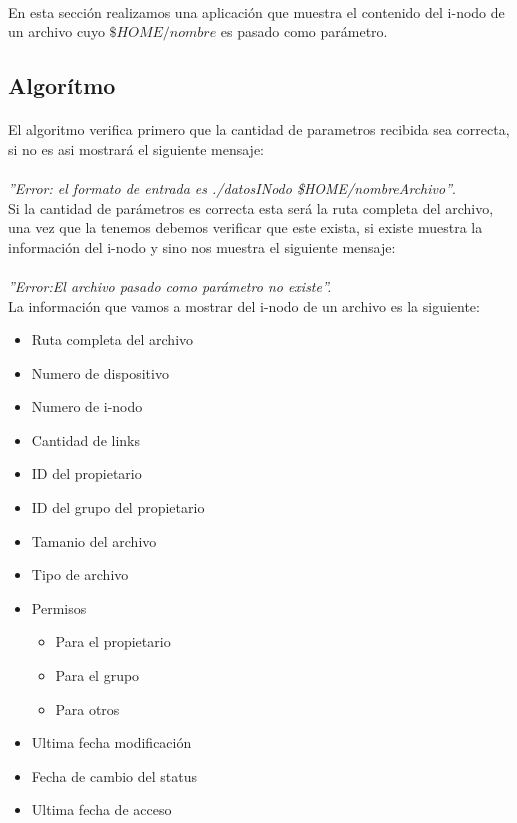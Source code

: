 \paragraph{} En esta secci\'on realizamos una aplicaci\'on que muestra el contenido del i-nodo de
un archivo cuyo $\$HOME/nombre$ es pasado como par\'ametro.

\subsection{Algorítmo}

\paragraph{} El algoritmo verifica primero que la cantidad de parametros recibida sea correcta, si no 
es asi mostrar\'a el siguiente mensaje: 

\paragraph{}\emph{''Error: el formato de entrada es ./datosINodo \$HOME/nombreArchivo''}.\\ 

Si la cantidad de par\'ametros es correcta esta ser\'a la ruta completa del archivo, 
una vez que la tenemos debemos verificar que este exista, si existe muestra la informaci\'on 
del i-nodo y sino nos muestra el siguiente mensaje:

\paragraph{}\emph{''Error:El archivo pasado como par\'ametro no existe''.}\\

La informaci\'on que vamos a mostrar del i-nodo de un archivo es la siguiente:

\begin{itemize}
	\item Ruta completa del archivo
	\item Numero de dispositivo
	\item Numero de i-nodo
	\item Cantidad de links
	\item ID del propietario
	\item ID del grupo del propietario
	\item Tamanio del archivo
	\item Tipo de archivo	
	\item Permisos
		\begin{itemize}
	      		\item Para el propietario
	      		\item Para el grupo
	      		\item Para otros
		\end{itemize}
	\item Ultima fecha modificaci\'on
	\item Fecha de cambio del status
	\item Ultima fecha de acceso
\end{itemize}

